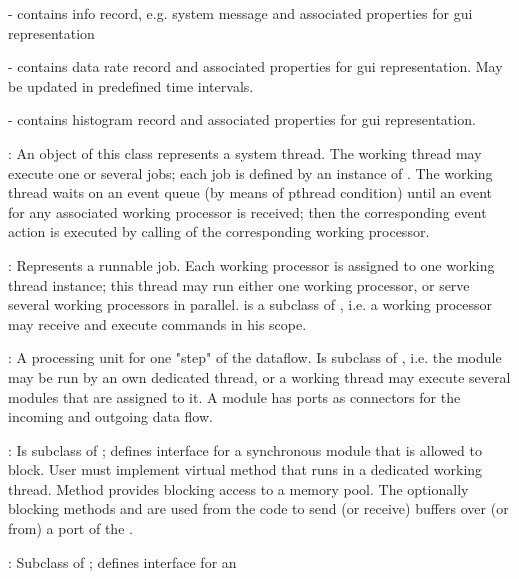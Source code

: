 \begin{compactdesc}
\begin{compactitem}[$\bullet$]
\item {} - contains info record, e.g. system message 
      and associated properties for gui representation
\item {} - contains data rate record and associated 
      properties for gui representation. May be updated in predefined time intervals.
\item {} - contains histogram record and 
      associated properties for gui representation.
\end{compactitem}
\item[\class{dabc::WorkingThread}] : An object of this class represents a system thread. 
   The working thread may execute one or several jobs; each job is defined 
   by an instance of . The working thread waits on an 
   event queue (by means of pthread condition) until an event for any 
   associated working processor is received; then the corresponding event action is 
   executed by calling  of the corresponding working processor.
\item[\class{dabc::WorkingProcessor}] : Represents a runnable job. Each 
   working processor is assigned to one working thread instance; 
   this thread may run either one working processor, or serve several
    working processors in parallel. 
     is a subclass of , 
   i.e. a working processor may receive and execute commands in 
   his scope. 
\item[\class{dabc::Module}] : A processing unit for one "step" of the dataflow. 
   Is subclass of , i.e. the module may be run by an own 
   dedicated thread, or a working thread may execute several modules that 
   are assigned to it. A module has ports as connectors for the 
   incoming and outgoing data flow.   
\item[\class{dabc::ModuleSync}] : Is subclass of ; defines interface for a 
   synchronous module that is allowed to block. User must implement virtual 
   method  that runs in a dedicated working thread. 
   Method  provides blocking access to a memory pool. 
   The optionally blocking methods  and
     are used from the  
    code to send (or receive) buffers over (or from) 
    a port of the .  
\item[\class{dabc::ModuleAsync}] : Subclass of ; defines interface for an 

\end{compactdesc}
